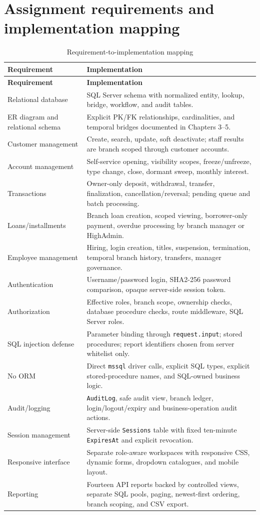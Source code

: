 \documentclass[11pt,a4paper,oneside]{report}
\begin{document}
\section{Assignment requirements and implementation mapping}
\begin{longtable}{L{0.24\textwidth}L{0.70\textwidth}}
\caption{Requirement-to-implementation mapping}\label{tab:reqmap}\\
\toprule
\textbf{Requirement} & \textbf{Implementation}\\
\midrule\endfirsthead
\toprule\textbf{Requirement} & \textbf{Implementation}\\\midrule\endhead
Relational database & SQL Server schema with normalized entity, lookup, bridge, workflow, and audit tables.\\
ER diagram and relational schema & Explicit PK/FK relationships, cardinalities, and temporal bridges documented in Chapters 3--5.\\
Customer management & Create, search, update, soft deactivate; staff results are branch scoped through customer accounts.\\
Account management & Self-service opening, visibility scopes, freeze/unfreeze, type change, close, dormant sweep, monthly interest.\\
Transactions & Owner-only deposit, withdrawal, transfer, finalization, cancellation/reversal; pending queue and batch processing.\\
Loans/installments & Branch loan creation, scoped viewing, borrower-only payment, overdue processing by branch manager or HighAdmin.\\
Employee management & Hiring, login creation, titles, suspension, termination, temporal branch history, transfers, manager governance.\\
Authentication & Username/password login, SHA2-256 password comparison, opaque server-side session token.\\
Authorization & Effective roles, branch scope, ownership checks, database procedure checks, route middleware, SQL Server roles.\\
SQL injection defense & Parameter binding through \texttt{request.input}; stored procedures; report identifiers chosen from server whitelist only.\\
No ORM & Direct \texttt{mssql} driver calls, explicit SQL types, explicit stored-procedure names, and SQL-owned business logic.\\
Audit/logging & \texttt{AuditLog}, safe audit view, branch ledger, login/logout/expiry and business-operation audit actions.\\
Session management & Server-side \texttt{Sessions} table with fixed ten-minute \texttt{ExpiresAt} and explicit revocation.\\
Responsive interface & Separate role-aware workspaces with responsive CSS, dynamic forms, dropdown catalogues, and mobile layout.\\
Reporting & Fourteen API reports backed by controlled views, separate SQL pools, paging, newest-first ordering, branch scoping, and CSV export.\\
\bottomrule
\end{longtable}
\end{document}
